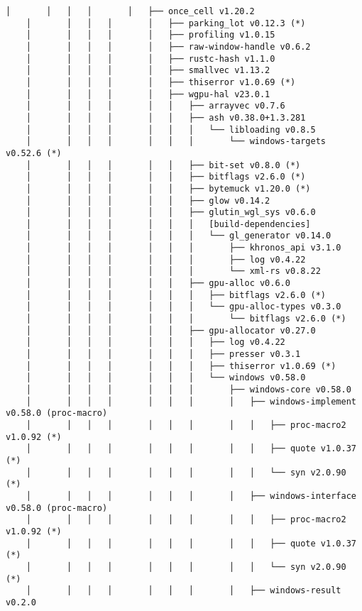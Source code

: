 \begin{lstlisting}[style=mystyle, caption={dependencias del proyecto}, label={lst:dependencias}]
    │       │   │   │       │   ├── once_cell v1.20.2
    │       │   │   │       │   ├── parking_lot v0.12.3 (*)
    │       │   │   │       │   ├── profiling v1.0.15
    │       │   │   │       │   ├── raw-window-handle v0.6.2
    │       │   │   │       │   ├── rustc-hash v1.1.0
    │       │   │   │       │   ├── smallvec v1.13.2
    │       │   │   │       │   ├── thiserror v1.0.69 (*)
    │       │   │   │       │   ├── wgpu-hal v23.0.1
    │       │   │   │       │   │   ├── arrayvec v0.7.6
    │       │   │   │       │   │   ├── ash v0.38.0+1.3.281
    │       │   │   │       │   │   │   └── libloading v0.8.5
    │       │   │   │       │   │   │       └── windows-targets v0.52.6 (*)
    │       │   │   │       │   │   ├── bit-set v0.8.0 (*)
    │       │   │   │       │   │   ├── bitflags v2.6.0 (*)
    │       │   │   │       │   │   ├── bytemuck v1.20.0 (*)
    │       │   │   │       │   │   ├── glow v0.14.2
    │       │   │   │       │   │   ├── glutin_wgl_sys v0.6.0
    │       │   │   │       │   │   │   [build-dependencies]
    │       │   │   │       │   │   │   └── gl_generator v0.14.0
    │       │   │   │       │   │   │       ├── khronos_api v3.1.0
    │       │   │   │       │   │   │       ├── log v0.4.22
    │       │   │   │       │   │   │       └── xml-rs v0.8.22
    │       │   │   │       │   │   ├── gpu-alloc v0.6.0
    │       │   │   │       │   │   │   ├── bitflags v2.6.0 (*)
    │       │   │   │       │   │   │   └── gpu-alloc-types v0.3.0
    │       │   │   │       │   │   │       └── bitflags v2.6.0 (*)
    │       │   │   │       │   │   ├── gpu-allocator v0.27.0
    │       │   │   │       │   │   │   ├── log v0.4.22
    │       │   │   │       │   │   │   ├── presser v0.3.1
    │       │   │   │       │   │   │   ├── thiserror v1.0.69 (*)
    │       │   │   │       │   │   │   └── windows v0.58.0
    │       │   │   │       │   │   │       ├── windows-core v0.58.0
    │       │   │   │       │   │   │       │   ├── windows-implement v0.58.0 (proc-macro)
    │       │   │   │       │   │   │       │   │   ├── proc-macro2 v1.0.92 (*)
    │       │   │   │       │   │   │       │   │   ├── quote v1.0.37 (*)
    │       │   │   │       │   │   │       │   │   └── syn v2.0.90 (*)
    │       │   │   │       │   │   │       │   ├── windows-interface v0.58.0 (proc-macro)
    │       │   │   │       │   │   │       │   │   ├── proc-macro2 v1.0.92 (*)
    │       │   │   │       │   │   │       │   │   ├── quote v1.0.37 (*)
    │       │   │   │       │   │   │       │   │   └── syn v2.0.90 (*)
    │       │   │   │       │   │   │       │   ├── windows-result v0.2.0

\end{lstlisting}
